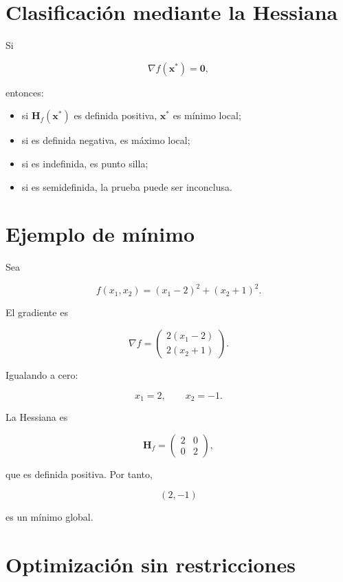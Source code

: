 \documentclass[
  spanish,
  11pt,
  letterpaper,
  DIV=11,
  numbers=noendperiod]{scrreprt}
\providecommand{\tightlist}{%
  \setlength{\itemsep}{0pt}\setlength{\parskip}{0pt}}
\theoremstyle{definition}
\theoremstyle{plain}
\theoremstyle{definition}
\theoremstyle{remark}
\begin{document}
\section{Clasificación mediante la
Hessiana}\label{clasificaciuxf3n-mediante-la-hessiana}

Si

\[
\nabla f(\mathbf{x}^{*})=\mathbf{0},
\]

entonces:

\begin{itemize}
\tightlist
\item
  si \(\mathbf{H}_f(\mathbf{x}^{*})\) es definida positiva,
  \(\mathbf{x}^{*}\) es mínimo local;
\item
  si es definida negativa, es máximo local;
\item
  si es indefinida, es punto silla;
\item
  si es semidefinida, la prueba puede ser inconclusa.
\end{itemize}

\section{Ejemplo de mínimo}\label{ejemplo-de-muxednimo}

Sea

\[
f(x_1,x_2)
=
(x_1-2)^2
+
(x_2+1)^2.
\]

El gradiente es

\[
\nabla f
=
\begin{pmatrix}
2(x_1-2)\\
2(x_2+1)
\end{pmatrix}.
\]

Igualando a cero:

\[
x_1=2,
\qquad
x_2=-1.
\]

La Hessiana es

\[
\mathbf{H}_f
=
\begin{pmatrix}
2 & 0\\
0 & 2
\end{pmatrix},
\]

que es definida positiva. Por tanto,

\[
(2,-1)
\]

es un mínimo global.

\section{Optimización sin
restricciones}\label{optimizaciuxf3n-sin-restricciones}
\end{document}
